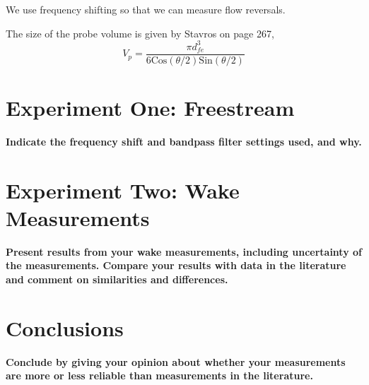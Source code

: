 \documentclass{article}
\begin{document}
We use frequency shifting so that we can measure flow reversals.

The size of the probe volume is given by Stavros on page 267, 
\begin{equation}
 V_p = \frac{\pi d_{fe}^3}{6\text{Cos}(\theta/2)\text{Sin}(\theta/2)}
\end{equation}


\section{Experiment One: Freestream}

\textbf{Indicate the frequency shift and bandpass filter settings used,
and why.} 

\section{Experiment Two: Wake Measurements}

\textbf{Present results from your wake measurements, including
uncertainty of the measurements. Compare your results with data in the
literature and comment on similarities and differences. } 


\section{Conclusions}


\textbf{Conclude by giving your opinion about whether your measurements
are more or less reliable than measurements in the literature.} 

%
%
%
\end{document}
